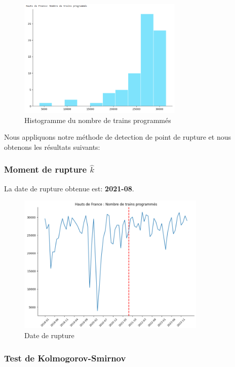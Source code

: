 {\begin{figure}[H]
  \centering
  \includegraphics[width=0.7\textwidth]{HF_TP_2.png}
  \caption{Histogramme du nombre de trains programmés}
\end{figure}

Nous appliquons notre méthode de detection de point de rupture et nous obtenons les résultats suivants:

\subsubsection{Moment de rupture $\hat{k}$}

La date de rupture obtenue est: \textbf{2021-08}. 

\begin{figure}[H]
  \centering
  \includegraphics[width=0.8\textwidth]{HF_TP_3.png}
  \caption{Date de rupture}
\end{figure}

\subsubsection{Test de Kolmogorov-Smirnov}

}
